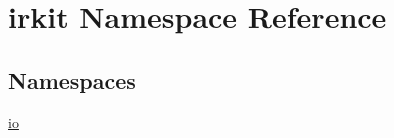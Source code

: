 \hypertarget{namespaceirkit}{}\section{irkit Namespace Reference}
\label{namespaceirkit}
\subsection*{Namespaces}
\begin{DoxyCompactItemize}
\item 
 \mbox{\hyperlink{namespaceirkit_1_1io}{io}}
\end{DoxyCompactItemize}
